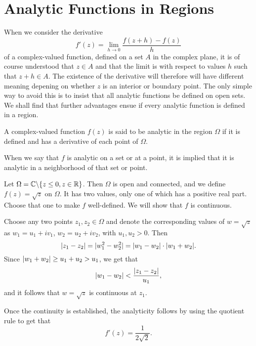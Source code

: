 \section{Analytic Functions in Regions}
When we consider the derivative $$f'(z)=\lim_{h \rightarrow 0}\dfrac{f(z+h)-f(z)}{h}$$ of a complex-valued function, defined on a set $A$ in the complex plane, it is of course understood that $z \in A$ and that the limit is with respect to values $h$ such that $z+h \in A$. The existence of the derivative will therefore will have different meaning depening on whether $z$ is an interior or boundary point. The only simple way to avoid this is to insist that all analytic functions be defined on open sets. We shall find that further advantages ensue if every analytic function is defined in a region.

\begin{definition}
	A complex-valued function $f(z)$ is said to be analytic in the region $\Omega$ if it is defined and has a derivative of each point of $\Omega$.
\end{definition}

When we say that $f$ is analytic on a set or at a point, it is implied that it is analytic in a neighborhood of that set or point.

\begin{example}
	Let $\Omega=\mathbb C \backslash \{z \le 0, z \in \mathbb R\}$. Then $\Omega$ is open and connected, and we define $f(z)=\sqrt{z}$ on $\Omega$. It has two values, only one of which has a positive real part. Choose that one to make $f$ well-defined. We will show that $f$ is continuous.
	
	Choose any two points $z_1,z_2 \in \Omega$ and denote the corresponding values of $w=\sqrt{z}$ as $w_1=u_1+iv_1$, $w_2=u_2+iv_2$, with $u_1,u_2>0$. Then $$\lvert z_1-z_2 \rvert=\lvert w_1^2-w_2^2 \rvert=\lvert w_1-w_2 \rvert \cdot \lvert w_1+w_2 \rvert.$$ Since $\lvert w_1+w_2 \rvert \ge u_1+u_2>u_1$, we get that $$\lvert w_1-w_2 \rvert<\dfrac{\lvert z_1-z_2 \rvert}{u_1},$$ and it follows that $w=\sqrt{z}$ is continuous at $z_1$.
	
	Once the continuity is established, the analyticity follows by using the quotient rule to get that $$f'(z)=\dfrac{1}{2\sqrt{2}}.$$
\end{example}

